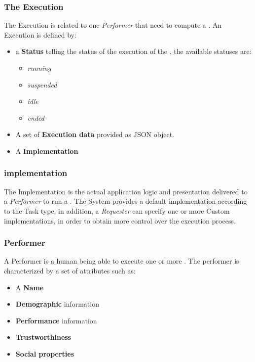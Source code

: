 \subsubsection{The Execution}
The Execution is related to one \emph{Performer} that need to compute a \utask{}.
An Execution is defined by:
\begin{itemize}
    \item a \textbf{Status} telling the status of the execution of the \utask{},
    the available statuses are:
    \begin{itemize}
        \item \emph{running}
        \item \emph{suspended}
        \item \emph{idle}
        \item \emph{ended}
    \end{itemize}

    \item A set of \textbf{Execution data} provided as \ac{JSON} object.

    \item A \utask{} \textbf{Implementation}
\end{itemize}







\subsubsection{\utask{} implementation}
The \utask{} Implementation is the actual application logic and presentation
delivered to a \emph{Performer} to run a \utask{}. The System provides a default
implementation according to the Task type, in addition, a \emph{Requester} can
specify one or more Custom implementations, in order to obtain more control over
the execution process.








\subsubsection{Performer}
A Performer is a human being able to execute one or more \utask{}. The performer is characterized by a set of attributes such as:

\begin{itemize}
    \item A \textbf{Name}
    \item \textbf{Demographic} information
    \item \textbf{Performance} information
    \item \textbf{Trustworthiness}
    \item \textbf{Social properties}
\end{itemize}






